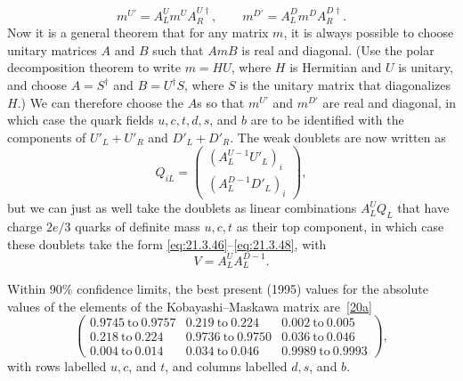 \begin{equation}
m^{U\prime}=A_L^U m^U A_R^{U\dagger},
\qquad
m^{D\prime}=A_L^D m^D A_R^{D\dagger}.
\tag{21.3.52}\label{eq:21.3.52}
\end{equation}
Now it is a general theorem that for any matrix $m$, it is always possible to choose unitary matrices $A$ and $B$ such that $AmB$ is real and diagonal. (Use the polar decomposition theorem to write $m=HU$, where $H$ is Hermitian and $U$ is unitary, and choose $A=S^\dagger$ and $B=U^\dagger S$, where $S$ is the unitary matrix that diagonalizes $H$.) We can therefore choose the $A$s so that $m^{U\prime}$ and $m^{D\prime}$ are real and diagonal, in which case the quark fields $u,c,t,d,s$, and $b$ are to be identified with the components of $U'_L+U'_R$ and $D'_L+D'_R$. The weak doublets are now written as
\[
Q_{iL}
=
\begin{pmatrix}
(A_L^{U-1}U'_L)_i\\
(A_L^{D-1}D'_L)_i
\end{pmatrix},
\]
but we can just as well take the doublets as linear combinations $A_L^UQ_L$ that have charge $2e/3$ quarks of definite mass $u,c,t$ as their top component, in which case these doublets take the form \eqref{eq:21.3.46}--\eqref{eq:21.3.48}, with
\begin{equation}
V=A_L^U A_L^{D-1}.
\tag{21.3.53}\label{eq:21.3.53}
\end{equation}

Within 90\% confidence limits, the best present (1995) values for the absolute values of the elements of the Kobayashi--Maskawa matrix are~\hyperref[ch21-ref-20a]{[20a]}
\[
\begin{pmatrix}
0.9745\ \text{to}\ 0.9757&
0.219\ \text{to}\ 0.224&
0.002\ \text{to}\ 0.005\\
0.218\ \text{to}\ 0.224&
0.9736\ \text{to}\ 0.9750&
0.036\ \text{to}\ 0.046\\
0.004\ \text{to}\ 0.014&
0.034\ \text{to}\ 0.046&
0.9989\ \text{to}\ 0.9993
\end{pmatrix},
\]
with rows labelled $u,c$, and $t$, and columns labelled $d,s$, and $b$.

